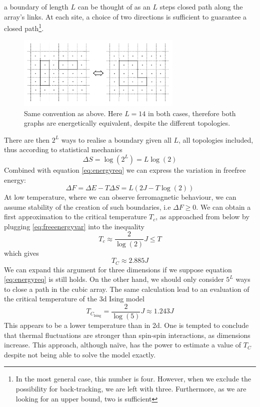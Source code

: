 a boundary of length $L$ can be thought of as  an $L$ steps closed path
along the array's links. At each site, a choice of two directions is 
sufficient to guarantee a closed path\footnote{In the most general case, this
  number is four. However, when we exclude the possibility for back-tracking,
  we are left with three. Furthermore, as we are looking for an upper bound,
two is sufficient}.
\begin{figure}
  \centering
  \includegraphics[width=0.7\textwidth]{Images/ising2.png}
  \caption{Same convention as above. Here $L=14$ in both cases, therefore
    both graphs are energetically equivalent, despite the different
  topologies.}
  \label{fig:ising2}
\end{figure}


There are then $2^L$ ways to realise a boundary given all
$L$, all topologies included, thus according to statistical mechanics
\begin{equation}
\Delta S = \log(2^L) = L\log(2)
\end{equation}
Combined with equation \eqref{eq:energyreq} we can express the variation in
freefree energy:
\begin{equation}
  \Delta F = \Delta E - T\Delta S = L(2J-T\log(2))
  \label{eq:freeenergyvar}
\end{equation}
At low temperature, where we can observe ferromagnetic behaviour, we can assume
stability of the creation of such boundaries, i.e $\Delta F \geq 0$. We can
obtain a first approximation to the critical temperature $T_c$, as approached
from below by plugging \eqref{eq:freeenergyvar} into the inequality
\begin{equation}
  T_c\approx \frac{2}{\log(2)}J\leq T
\end{equation}
which gives
\begin{equation}
  \boxed{
  T_C\approx 2.885J
}
\end{equation}
We can expand this argument for three dimensions if we suppose equation
\eqref{eq:energyreq} is still holds. On the other hand, we should only consider
$5^L$ ways to close a path in the cubic array. The same calculation lead to an
evaluation of the critical temperature of the 3d Ising model
\begin{equation}
  T_{C_{\mathrm{Ising}}} = \frac{2}{\log(5)}J\approx 1.243J
\end{equation}
This appears to be a lower temperature than in 2d. One is tempted to conclude
that thermal fluctuations are stronger than spin-spin interactions, as
dimensions increase. This approach, although na\"ive, has the power to
estimate a value of $T_C$ despite not being able to solve the model exactly.

